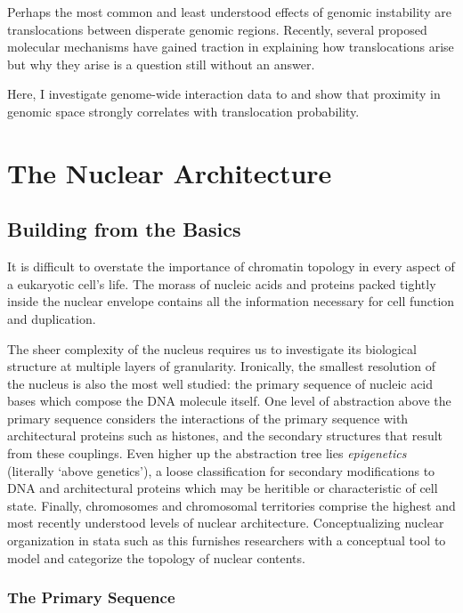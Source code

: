 \documentclass[phd,tocprelim]{cornell}
\begin{document}
Perhaps the most common and least understood effects of genomic instability are
translocations between disperate genomic regions.  Recently, several proposed
molecular mechanisms have gained traction in explaining how translocations arise
but why they arise is a question still without an answer.

Here, I investigate genome-wide interaction data to and show that proximity in
genomic space strongly correlates with translocation probability.






\chapter{The Nuclear Architecture}

\section{Building from the Basics}

It is difficult to overstate the importance of chromatin topology in
every aspect of a eukaryotic cell's life.  The morass of nucleic acids and
proteins packed tightly inside the nuclear envelope contains all the
information necessary for cell function and duplication.

The sheer complexity of the nucleus requires us to investigate its biological
structure at multiple layers of granularity.  Ironically, the smallest resolution
of the nucleus is also the most well studied: the primary sequence of nucleic
acid bases which compose the DNA molecule itself.  One level of abstraction
above the primary sequence considers the interactions of the primary sequence
with architectural proteins such as histones, and the secondary structures that
result from these couplings.  Even higher up the abstraction tree lies
\textit{epigenetics} (literally `above genetics'\cite{dictepi2014}), a loose
classification for secondary modifications to DNA and architectural proteins
which may be heritible or characteristic of cell state.  Finally, chromosomes
and chromosomal territories comprise the highest and most recently understood
levels of nuclear architecture.  Conceptualizing nuclear organization in
stata such as this furnishes researchers with a conceptual tool to model
and categorize the topology of nuclear contents.

\subsection{The  Primary Sequence}
\end{document}
